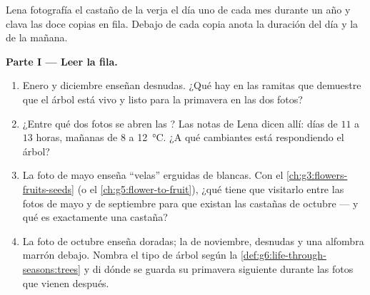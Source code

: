 \begin{problem}\label{pb:g6:life-through-seasons:1}
Lena fotografía el castaño de la verja el día uno de cada mes durante
un año y clava las doce copias en fila. Debajo de cada copia anota la
duración del día y la  de la mañana.

\medskip\noindent\textbf{Parte I --- Leer la fila.}
\begin{enumerate}
  \item Enero y diciembre enseñan  desnudas. ¿Qué hay en las
        ramitas que demuestre que el árbol está vivo y listo para la
        primavera en las dos fotos?
  \item ¿Entre qué dos fotos se abren las ? Las notas de Lena
        dicen allí: días de $11$ a $13$ horas, mañanas de $8$ a
        \qty{12}{\degreeCelsius}. ¿A qué  cambiantes está
        respondiendo el árbol?
  \item La foto de mayo enseña ``velas'' erguidas de  blancas.
        Con el \cref{ch:g3:flowers-fruits-seeds} (o el
        \cref{ch:g5:flower-to-fruit}), ¿qué tiene que visitarlo entre
        las fotos de mayo y de septiembre para que existan las castañas
        de octubre --- y qué es exactamente una castaña?
  \item La foto de octubre enseña  doradas; la de noviembre,
         desnudas y una alfombra marrón debajo. Nombra el tipo de
        árbol según la \cref{def:g6:life-through-seasons:trees} y di
        dónde se guarda su primavera siguiente durante las fotos que
        vienen después.
\end{enumerate}


\end{problem}
